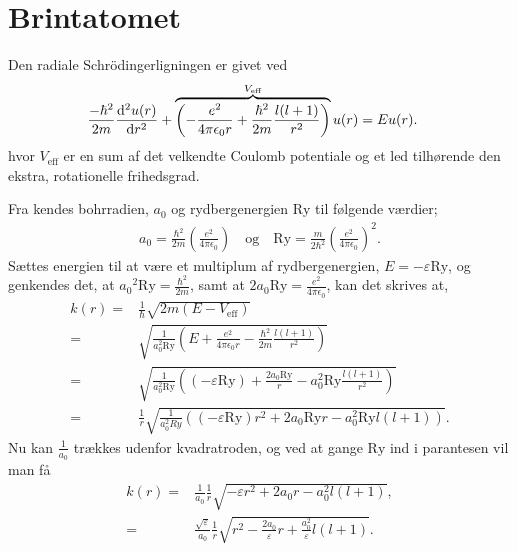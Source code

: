 \section{Brintatomet}
Den radiale Schrödingerligningen er givet ved \cite[s. 140]{griffiths}
%
\begin{align}
    \frac{-\hbar^{2}}{2m}\diff[2]{u(r)}{r} + \overbrace{\left( - \frac{e^{2}}{4\pi\epsilon_{0}r} + \frac{\hbar^{2}}{2m}\frac{l(l+1)}{r^{2}} \right)}^{V_{\text{eff}}} u(r) & \nonumber = Eu(r).
\end{align}
%
hvor $V_{\text{eff}}$ er en sum af det velkendte Coulomb potentiale og et led tilhørende den ekstra, rotationelle frihedsgrad.

Fra \cite{griffiths} kendes bohrradien, $a_{0}$ og rydbergenergien $\mathrm{Ry}$ til følgende værdier;
\begin{align}
    a_{0} = \frac{\hbar^{2}}{2m} {\left(\frac{e^{2}}{4\pi\epsilon_{0}} \right) \quad \text{og} \quad \mathrm{Ry} = \frac{m}{2\hbar^{2}}\left(\frac{e^{2}}{4\pi\epsilon_0} \right)}^{2}.
    \label{eq:konstanter}
\end{align}
%
Sættes energien til at være et multiplum af rydbergenergien, $E=-\varepsilon \mathrm{Ry}$, og genkendes det, at ${a_{0}}^{2}\mathrm{Ry} = \frac{\hbar^{2}}{2m}$, samt at $2a_{0}\mathrm{Ry} = \frac{e^{2}}{4\pi\epsilon_{0}}$, kan det skrives at,
\begin{align}
    k(r) = & \frac{1}{\hbar} \sqrt{2m\left( E - V_{\text{eff}} \right)}\\
    = & \sqrt{\frac{1}{a_{0}^{2}\mathrm{\mathrm{Ry}}} \left( E + \frac{e^{2}}{4\pi\epsilon_{0}r} - \frac{\hbar^{2}}{2m}\frac{l(l+1)}{r^{2}} \right)}\\
    = & \sqrt{\frac{1}{a_{0}^{2}\mathrm{Ry}} \left( (-\varepsilon \mathrm{Ry}) + \frac{2a_{0}\mathrm{Ry}}{r} - a_{0}^{2}\mathrm{Ry}\frac{l(l+1)}{r^{2}} \right)}\\
    = & \frac{1}{r} \sqrt{\frac{1}{a_{0}^{2}{Ry}} \left( (-\varepsilon \mathrm{Ry})r^{2} + 2a_{0}\mathrm{Ry} r - a_{0}^{2}\mathrm{Ry} l(l+1) \right)}.
\end{align}
Nu kan $\frac{1}{a_0}$ trækkes udenfor kvadratroden, og ved at gange $\mathrm{Ry}$ ind i parantesen vil man få
\begin{align}
    k(r) = & \frac{1}{a_0} \frac{1}{r} \sqrt{-\varepsilon r^2 + 2a_0r - a_0^2l(l+1)}, \\
    = & \frac{\sqrt{\varepsilon}}{a_0} \frac{1}{r} \sqrt{r^2 - \frac{2a_0}{\varepsilon}r + \frac{a_0^2}{\varepsilon}l(l+1)}.
\end{align}

